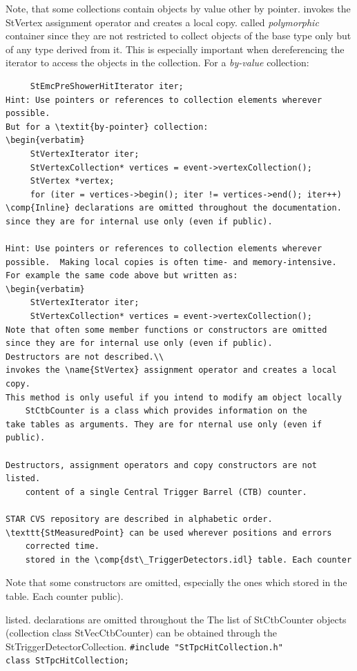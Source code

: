 Note, that some collections contain objects by value other by pointer.
invokes the StVertex assignment operator and creates a local copy.
called \textit{polymorphic} container since they are not restricted to
collect objects of the base type only but of any type derived from
it. This is especially important when dereferencing the iterator to
access the objects in the collection.  For a \textit{by-value}
collection:
\begin{verbatim}
     StEmcPreShowerHitIterator iter;
Hint: Use pointers or references to collection elements wherever possible.
But for a \textit{by-pointer} collection:
\begin{verbatim}
     StVertexIterator iter;
     StVertexCollection* vertices = event->vertexCollection();
     StVertex *vertex;
     for (iter = vertices->begin(); iter != vertices->end(); iter++)
\comp{Inline} declarations are omitted throughout the documentation.
since they are for internal use only (even if public). 

Hint: Use pointers or references to collection elements wherever
possible.  Making local copies is often time- and memory-intensive.
For example the same code above but written as:
\begin{verbatim}
     StVertexIterator iter;
     StVertexCollection* vertices = event->vertexCollection();
Note that often some member functions or constructors are omitted
since they are for internal use only (even if public).
Destructors are not described.\\
invokes the \name{StVertex} assignment operator and creates a local copy.
This method is only useful if you intend to modify am object locally
    StCtbCounter is a class which provides information on the
take tables as arguments. They are for nternal use only (even if public).

Destructors, assignment operators and copy constructors are not listed.
    content of a single Central Trigger Barrel (CTB) counter.  
    
STAR CVS repository are described in alphabetic order.
\texttt{StMeasuredPoint} can be used wherever positions and errors
    corrected time.
    stored in the \comp{dst\_TriggerDetectors.idl} table. Each counter
\end{verbatim}
Note that some constructors are omitted, especially the ones which
    stored in the  table. Each counter
public).

    
listed.   declarations are omitted throughout the
    The list of StCtbCounter objects (collection class StVecCtbCounter) can be obtained
    through the StTriggerDetectorCollection.
    \verb+#include "StTpcHitCollection.h"+\\
    \verb+class StTpcHitCollection;+\\
%
   
